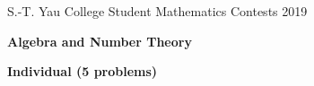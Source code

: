 \documentclass[10pt]{article}
\begin{document}



\begin{center}
S.-T. Yau College Student Mathematics Contests 2019

\vspace{0.1cm}

\Large {\bf Algebra and Number Theory}

\vspace{0.1cm}

\large {\bf Individual (5 problems)}

\vspace{0.1cm}
\end{center}
\end{document}
